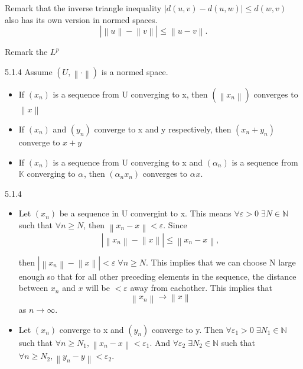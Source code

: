 \documentclass[a4paper,norsk]{article}
\renewcommand{\geq}{\geqslant}
\renewcommand{\leq}{\leqslant}
\renewcommand{\epsilon}{\varepsilon}
\begin{document}
Remark that the inverse triangle inequality $ \left| d \left( u, v \right)  - d \left( u, w \right)  \right| \leq d \left( w, v \right)  $ also has its own version in normed spaces.
\[
    \left| \left\lVert u \right\rVert - \left\lVert v \right\rVert  \right| \leq \left\lVert u - v \right\rVert.
\]


Remark the $ L^p $ 


\begin{propositionbox}{5.1.4}{}
Assume $ \left( U, \left\lVert \cdot \right\rVert  \right)  $ is a normed space.
\begin{itemize}
    \item If $ \left( x_n \right)  $ is a sequence from U converging to x, then $ \left( \left\lVert x_n \right\rVert  \right)  $ converges to $ \left\lVert x \right\rVert  $ 
    \item If $ \left( x_n \right)  $ and $ \left( y_n \right)  $ converge to x and y respectively, then $ \left( x_n + y_n \right)  $ converge to $ x+y $  
    \item If $ \left( x_n \right)  $ is a sequence from U converging to x and $ \left( \alpha_{n}^{}  \right)  $ is a sequence from $ \mathbb{K}  $ converging to $ \alpha_{}^{}  $, then $ \left( \alpha_{n}^{} x_n  \right)  $ converges to $ \alpha_{}^{} x $.
\end{itemize}


\begin{proofbox}{5.1.4}{}
    \begin{itemize}
        \item Let $ \left( x_n \right)  $ be a sequence in U convergint to x. This means $ \forall \epsilon > 0 \; \exists  N \in \mathbb{N} $ such that $ \forall n \geq N $, then $ \left\lVert x_n - x \right\rVert < \epsilon  $. Since 
        \[
          \left| \left\lVert x_n \right\rVert - \left\lVert   x \right\rVert  \right| \leq \left\lVert x_n - x \right\rVert,    
        \]
         
        then $ \left| \left\lVert x_n \right\rVert - \left\lVert x \right\rVert  \right| < \epsilon  \; \forall n \geq N $. This implies that we can choose N large enough so that for all other preceding elements in the sequence, the distance between $ x_n $  and $ x $ will be $ < \epsilon  $ away from eachother. This implies that 
        \[
            \left\lVert x_n \right\rVert \to \left\lVert x \right\rVert 
        \]
        as $ n \to \infty $.
        \item Let $ \left( x_n \right)  $  converge to x and $ \left( y_n \right)  $ converge to y. Then $ \forall \epsilon _1 > 0 \; \exists N_1 \in \mathbb{N}$ such that $ \forall n \geq N_1, \left\lVert x_n - x \right\rVert < \epsilon _1 $. And $ \forall \epsilon _2 \; \exists N_2 \in \mathbb{N} $ such that $ \forall n \geq N_2 , \left\lVert y_n - y \right\rVert < \epsilon _2 $.
        


\end{itemize}
\end{proofbox}
\end{propositionbox}
\end{document}

